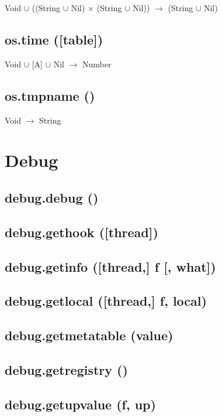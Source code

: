 \documentclass[12pt]{article}
\begin{document}
Void $\cup$
((String $\cup$ Nil) $\times$
(String $\cup$ Nil)) $\rightarrow$
(String $\cup$ Nil)

\subsection{os.time ([table])}

Void $\cup$ [A] $\cup$ Nil $\rightarrow$ Number

\subsection{os.tmpname ()}

Void $\rightarrow$ String

\newpage

\section{Debug}

\subsection{debug.debug ()}

\subsection{debug.gethook ([thread])}

\subsection{debug.getinfo ([thread,] f [, what])}

\subsection{debug.getlocal ([thread,] f, local)}

\subsection{debug.getmetatable (value)}

\subsection{debug.getregistry ()}

\subsection{debug.getupvalue (f, up)}
\end{document}
